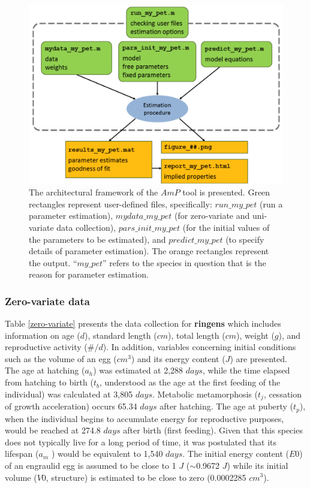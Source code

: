 \begin{figure}[ht]
	\includegraphics[width=1.0\textwidth]{figures/Chap4AmP_flow.png}
	\centering
	\caption{The architectural framework of the $AmP$ tool is presented. Green rectangles represent user-defined files, specifically: \textbf{$run\_my\_pet$} (run a parameter estimation), \textbf{$mydata\_my\_pet$} (for zero-variate and uni-variate data collection), \textbf{$pars\_init\_my\_pet$} (for the initial values of the parameters to be estimated), and \textbf{$predict\_my\_pet$} (to specify details of parameter estimation). The orange rectangles represent the output. ``\textbf{$my\_pet$}'' refers to the species in question that is the reason for parameter estimation.}
	\label{Chap4AmP_flow}
\end{figure}

\subsubsection{Zero-variate data}

Table \ref{zero-variate} presents the data collection for \textbf{\gls{ringens}} which includes information on age ($d$), standard length ($cm$), total length ($cm$), weight ($g$), and reproductive activity ($\#/d$). In addition, variables concerning initial conditions such as the volume of an egg ($cm^3$) and its energy content ($J$) are presented.\\

The age at hatching ($a_{h}$) was estimated at 2,288 $days$, while the time elapsed from hatching to birth ($t_{b}$, understood as the age at the first feeding of the individual) was calculated at 3,805 $days$. Metabolic metamorphosis ($t_{j}$, cessation of growth acceleration) occurs 65.34 $days$ after hatching. The age at puberty ($t_{p}$), when the individual begins to accumulate energy for reproductive purposes, would be reached at 274.8 $days$ after birth (first feeding). Given that this species does not typically live for a long period of time, it was postulated that its lifespan ($a_{m}$	) would be equivalent to 1,540 $days$. The initial energy content ($E0$) of an engraulid egg is assumed to be close to 1 $J$ ($\sim$0.9672 $J$) while its initial volume ($V0$, structure) is estimated to be close to zero (0.0002285 $cm^3$).\\

